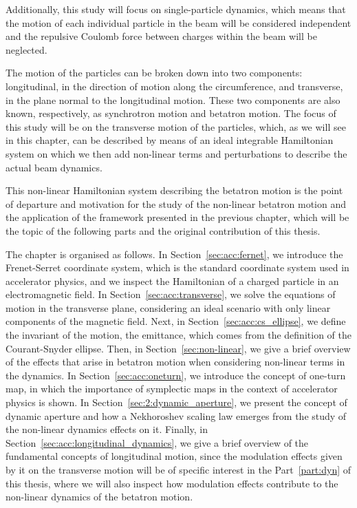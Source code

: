 Additionally, this study will focus on single-particle dynamics, which means that the motion of each individual particle in the beam will be considered independent and the repulsive Coulomb force between charges within the beam will be neglected. 

The motion of the particles can be broken down into two components: longitudinal, in the direction of motion along the circumference, and transverse, in the plane normal to the longitudinal motion. These two components are also known, respectively, as synchrotron motion and betatron motion.
The focus of this study will be on the transverse motion of the particles, which, as we will see in this chapter, can be described by means of an ideal integrable Hamiltonian system on which we then add non-linear terms and perturbations to describe the actual beam dynamics.

This non-linear Hamiltonian system describing the betatron motion is the point of departure and motivation for the study of the non-linear betatron motion and the application of the framework presented in the previous chapter, which will be the topic of the following parts and the original contribution of this thesis.

The chapter is organised as follows. In Section~\ref{sec:acc:fernet}, we introduce the Frenet-Serret coordinate system, which is the standard coordinate system used in accelerator physics, and we inspect the Hamiltonian of a charged particle in an electromagnetic field. In Section~\ref{sec:acc:transverse}, we solve the equations of motion in the transverse plane, considering an ideal scenario with only linear components of the magnetic field. Next, in Section~\ref{sec:acc:cs_ellipse}, we define the invariant of the motion, the emittance, which comes from the definition of the Courant-Snyder ellipse. Then, in Section~\ref{sec:non-linear}, we give a brief overview of the effects that arise in betatron motion when considering non-linear terms in the dynamics. In Section~\ref{sec:acc:oneturn}, we introduce the concept of one-turn map, in which the importance of symplectic maps in the context of accelerator physics is shown. In Section~\ref{sec:2:dynamic_aperture}, we present the concept of dynamic aperture and how a Nekhoroshev scaling law emerges from the study of the non-linear dynamics effects on it. Finally, in Section~\ref{sec:acc:longitudinal_dynamics}, we give a brief overview of the fundamental concepts of longitudinal motion, since the modulation effects given by it on the transverse motion will be of specific interest in the Part~\ref{part:dyn} of this thesis, where we will also inspect how modulation effects contribute to the non-linear dynamics of the betatron motion. 


